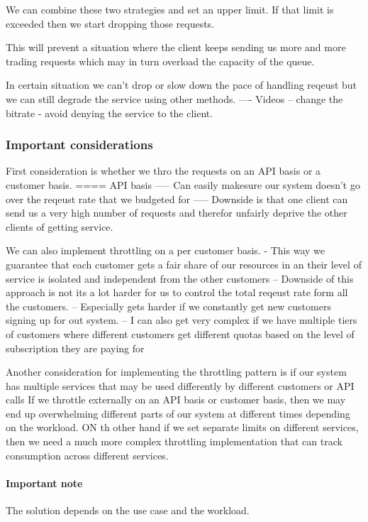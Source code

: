 \documentclass[a4paper, 11pt]{book}
\begin{document}
    We can combine these two strategies and set an upper limit.
    If that limit is exceeded then we start dropping those requests.

    This will prevent a situation where the client keeps sending us more and more trading requests which may in turn overload the capacity of the queue.

    In certain situation we can't drop or slow down the pace of handling reqeust but we can still degrade the service using other methods.
    ---- Videos -- change the bitrate - avoid denying the service to the client.

    \subsubsection{Important considerations}
    First consideration is whether we thro the requests on an API basis or a customer basis.
    ==== API basis
    ----- Can easily makesure our system doesn't go over the reqeust rate that we budgeted for
    ----- Downside is that one client can send us a very high number of requests and therefor unfairly deprive the other clients of getting service.

    We can also implement throttling on a per customer basis.
    - This way we guarantee that each customer gets a fair share of our resources in an their level of service is isolated and independent from the other customers
    -- Downside of this approach is not its a lot harder for us to control the total reqeust rate form all the customers.
    -- Especially gets harder if we constantly get new customers signing up for out system.
    -- I can also get very complex if we have multiple tiers of customers where different customers get different quotas based on the level of subscription they are paying for

    Another consideration for implementing the throttling pattern is if our system has multiple services that may be used differently by different customers or API calls
    If we throttle externally on an API basis or customer basis, then we may end up overwhelming different parts of our system at different times depending on the workload.
    ON th other hand if we set separate limits on different services, then we need a much more complex throttling implementation that can track consumption across different services.

    \paragraph{Important note}
    The solution depends on the use case and the workload.
\end{document}

